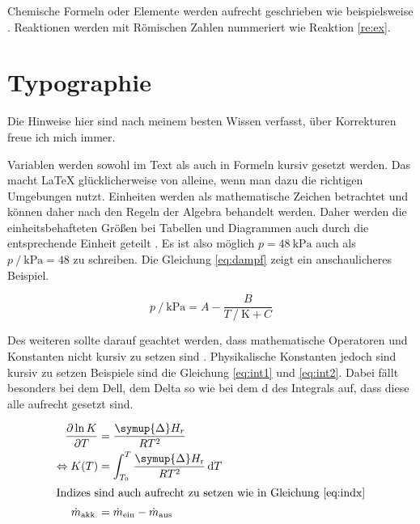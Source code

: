 Chemische Formeln oder Elemente werden aufrecht geschrieben wie beispielsweise .
Reaktionen werden mit Römischen Zahlen nummeriert wie Reaktion \eqref{re:ex}.

\begin{reaction} \label{re:ex}
\end{reaction}

	
\section{Typographie}\label{sec:typ}
Die Hinweise hier sind nach meinem besten Wissen verfasst, über Korrekturen freue ich mich immer.

Variablen werden sowohl im Text als auch in Formeln kursiv gesetzt werden.
Das macht \LaTeX{} glücklicherweise von alleine, wenn man dazu die richtigen Umgebungen nutzt.
Einheiten werden als mathematische Zeichen betrachtet und können daher nach den Regeln der Algebra behandelt werden.
Daher werden die einheitsbehafteten Größen bei Tabellen und Diagrammen auch durch die entsprechende Einheit geteilt \cite{si_brochure}.
Es ist also möglich \(p = \qty{48}{\kilo\pascal}\) auch als \(p\mathbin{/}\unit{\kilo\pascal} = 48 \) zu schreiben.	
Die Gleichung \eqref{eq:dampf} zeigt ein anschaulicheres Beispiel.

\begin{equation}\label{eq:dampf}
	p \mathbin{/} \unit{\kilo\pascal} = A - \frac{B}{T \mathbin{/} \unit{\kelvin} + C}
\end{equation}

Des weiteren sollte darauf geachtet werden, dass mathematische Operatoren und Konstanten nicht kursiv zu setzen sind \cite{green_book}. 
Physikalische Konstanten jedoch sind kursiv zu setzen Beispiele sind die Gleichung \eqref{eq:int1} und \eqref{eq:int2}.
Dabei fällt besonders bei dem Dell, dem Delta so wie bei dem d des Integrals auf, dass diese alle aufrecht gesetzt sind.

\begin{align}
	\pdv[order={1}]{\ln K}{T} &= \frac{\symup{\Delta}H_r}{RT^2} \label{eq:int1} \\
	\Leftrightarrow K(T) &= \int_{T_0}^T \frac{\symup{\Delta}H_\text{r}}{RT^2} \odif{T} \label{eq:int2} \\
	\intertext{Indizes sind auch aufrecht zu setzen wie in Gleichung \eqref{eq:indx}}
	\Dot{m} _{\text{akk.}} &= \Dot{m}_{\text{ein}} - \Dot{m} _{\text{aus}} \label{eq:indx}   
\end{align}


\newpage

\printbibliography

